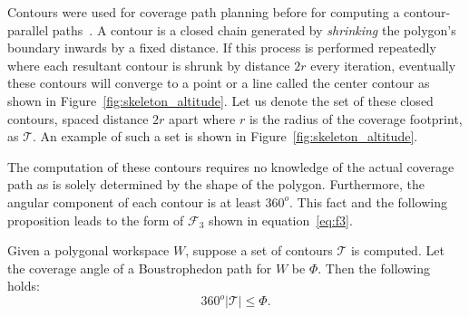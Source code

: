 \documentclass[../main.tex]{subfiles}
\begin{document}
Contours were used for coverage path planning before for computing a contour-parallel paths~\cite{held1991computational}. A contour is a closed chain generated by \emph{shrinking} the polygon's boundary inwards by a fixed distance. If this process is performed repeatedly where each resultant contour is shrunk by distance $2r$ every iteration, eventually these contours will converge to a point or a line called the center contour as shown in Figure~\ref{fig:skeleton_altitude}. Let us denote the set of these closed contours, spaced distance $2r$ apart where $r$ is the radius of the coverage footprint, as $\mathcal{T}$. An example of such a set is shown in Figure~\ref{fig:skeleton_altitude}.

The computation of these contours requires no knowledge of the actual coverage path as is solely determined by the shape of the polygon. Furthermore, the angular component of each contour is at least $360^o$. This fact and the following proposition leads to the form of $\mathcal{F}_3$ shown in equation~\ref{eq:f3}.

\begin{proposition}
	Given a polygonal workspace $W$, suppose a set of contours $\mathcal{T}$ is computed. Let the coverage angle of a Boustrophedon path for $W$ be $\Phi$. Then the following holds:
	\begin{equation}
		360^o|\mathcal{T}|\leq\Phi.
	\end{equation}
\end{proposition}
\end{document}
